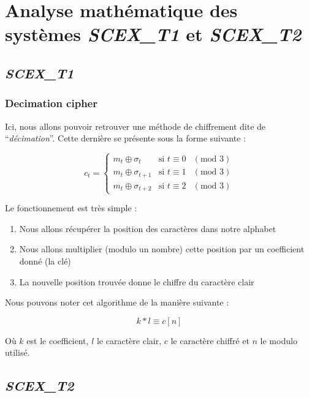 \section{Analyse mathématique des systèmes \textit{SCEX\_T1} et \textit{SCEX\_T2}}
\subsection{\textit{SCEX\_T1}}
\subsubsection{Decimation cipher}
Ici, nous allons pouvoir retrouver une méthode de chiffrement dite de \enquote{\textit{décimation}}. Cette dernière se présente sous la forme suivante :
\begin{center}
    \begin{equation}
	c_t = \left\{
	    \begin{array}{lll}
		m_{t}\oplus\sigma_{t} & \mbox{si } t\equiv 0 & (\mbox{mod } 3) \\
		m_{t}\oplus\sigma_{t+1} & \mbox{si } t\equiv 1 & (\mbox{mod } 3) \\
		m_{t}\oplus\sigma_{t+2} & \mbox{si } t\equiv 2 & (\mbox{mod } 3)
	    \end{array}
	\right.
    \end{equation}
\end{center}

Le fonctionnement est très simple :

\begin{enumerate}
 \item Nous allons récupérer la position des caractères dans notre alphabet
 \item Nous allons multiplier (modulo un nombre) cette position par un coefficient donné (la clé)
 \item La nouvelle position trouvée donne le chiffre du caractère clair
\end{enumerate}
Nous pouvons noter cet algorithme de la manière suivante :
\begin{center}
    \begin{equation}
	k*l\equiv c[n]
    \end{equation}
\end{center}
Où $k$ est le coefficient, $l$ le caractère clair, $c$ le caractère chiffré et $n$ le modulo utilisé.

\subsection{\textit{SCEX\_T2}}